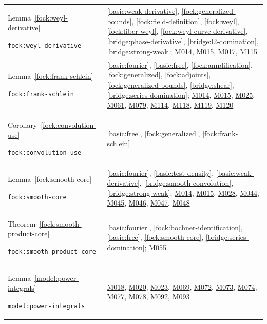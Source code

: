 \documentclass[11pt,a4paper]{article}
\theoremstyle{definition}
\theoremstyle{remark}
\begin{document}
\begin{longtable}{@{}p{}p{}@{}}
Lemma~\ref{fock:weyl-derivative}\par\nolinkurl{fock:weyl-derivative} & \ref{basic:weak-derivative}, \ref{fock:generalized-bounds}, \ref{fock:field-definition}, \ref{fock:weyl}, \ref{fock:fiber-weyl}, \ref{fock:weyl-curve-derivative}, \ref{bridge:phase-derivative}, \ref{bridge:l2-domination}, \ref{bridge:strong-weak}; \hyperref[base:M014]{M014}, \hyperref[base:M015]{M015}, \hyperref[base:M017]{M017}, \hyperref[base:M115]{M115} \\[4pt]
Lemma~\ref{fock:frank-schlein}\par\nolinkurl{fock:frank-schlein} & \ref{basic:fourier}, \ref{basic:free}, \ref{fock:amplification}, \ref{fock:generalized}, \ref{fock:adjoints}, \ref{fock:generalized-bounds}, \ref{bridge:shear}, \ref{bridge:series-domination}; \hyperref[base:M014]{M014}, \hyperref[base:M015]{M015}, \hyperref[base:M025]{M025}, \hyperref[base:M061]{M061}, \hyperref[base:M079]{M079}, \hyperref[base:M114]{M114}, \hyperref[base:M118]{M118}, \hyperref[base:M119]{M119}, \hyperref[base:M120]{M120} \\[4pt]
Corollary~\ref{fock:convolution-use}\par\nolinkurl{fock:convolution-use} & \ref{basic:free}, \ref{fock:generalized}, \ref{fock:frank-schlein} \\[4pt]
Lemma~\ref{fock:smooth-core}\par\nolinkurl{fock:smooth-core} & \ref{basic:fourier}, \ref{basic:test-density}, \ref{basic:weak-derivative}, \ref{bridge:smooth-convolution}, \ref{bridge:strong-weak}; \hyperref[base:M014]{M014}, \hyperref[base:M015]{M015}, \hyperref[base:M028]{M028}, \hyperref[base:M044]{M044}, \hyperref[base:M045]{M045}, \hyperref[base:M046]{M046}, \hyperref[base:M047]{M047}, \hyperref[base:M048]{M048} \\[4pt]
Theorem~\ref{fock:smooth-product-core}\par\nolinkurl{fock:smooth-product-core} & \ref{basic:fourier}, \ref{fock:bochner-identification}, \ref{basic:free}, \ref{fock:smooth-core}, \ref{bridge:series-domination}; \hyperref[base:M055]{M055} \\[4pt]
Lemma~\ref{model:power-integrals}\par\nolinkurl{model:power-integrals} & \hyperref[base:M018]{M018}, \hyperref[base:M020]{M020}, \hyperref[base:M023]{M023}, \hyperref[base:M069]{M069}, \hyperref[base:M072]{M072}, \hyperref[base:M073]{M073}, \hyperref[base:M074]{M074}, \hyperref[base:M077]{M077}, \hyperref[base:M078]{M078}, \hyperref[base:M092]{M092}, \hyperref[base:M093]{M093} \\[4pt]

\end{longtable}
\end{document}
